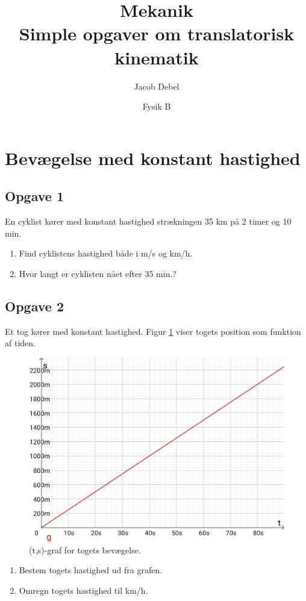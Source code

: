 \documentclass[a4paper, 12pt]{article}
\author{Jacob Debel}
\date{Fysik B}
\title{Mekanik\\\medskip
\large Simple opgaver om translatorisk kinematik}
\begin{document}
\maketitle


\section*{Bevægelse med konstant hastighed}
\label{sec:org9d3f065}

\subsection*{Opgave 1}
\label{sec:orgbe1d601}

En cyklist kører med konstant hastighed strækningen 35 km på 2 timer og 10 min.

\begin{enumerate}
\item Find cyklistens hastighed både i m/s og km/h.

\item Hvor langt er cyklisten nået efter 35 min.?
\end{enumerate}

\subsection*{Opgave 2}
\label{sec:org71456f1}

Et tog kører med konstant hastighed. Figur \ref{tog} viser togets position som funktion af tiden.
\begin{figure}[htbp]
\centering
\includegraphics[width=0.6\linewidth]{img/tog.png}
\caption{\label{tog}(t,s)-graf for togets bevægelse.}
\end{figure}

\begin{enumerate}
\item Bestem togets hastighed ud fra grafen.

\item Omregn togets hastighed til km/h.
\end{enumerate}
\end{document}
